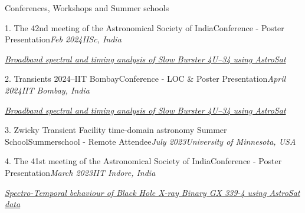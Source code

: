 \begin{section}{Conferences, Workshops and Summer schools}

    \begin{subsectionnobullet1}{1. The 42nd meeting of the Astronomical Society of India}{Conference - Poster Presentation}{\textit{Feb 2024}}{\textit{IISc, India}}
    \vspace{-1em}
    \item\textit{\href{https://www.dropbox.com/scl/fi/aw33s2tmk6wsrwwbju25e/ASI-2024-poster.pdf?rlkey=aiasm86d2e3t40235q0knu635&st=3qr65pz8&dl=0}{Broadband spectral and timing analysis of Slow Burster 4U--34 using AstroSat}}
    \end{subsectionnobullet1}

    \vspace{-0.5em}

    \begin{subsectionnobullet1}{2. Transients 2024--IIT Bombay}{Conference - LOC \& Poster Presentation}{\textit{April 2024}}{\textit{IIT Bombay, India}}
    \vspace{-1em}
    \item\textit{\href{https://www.dropbox.com/scl/fi/aw33s2tmk6wsrwwbju25e/ASI-2024-poster.pdf?rlkey=aiasm86d2e3t40235q0knu635&st=3qr65pz8&dl=0}{Broadband spectral and timing analysis of Slow Burster 4U--34 using AstroSat}}
    \end{subsectionnobullet1}

     \vspace{-0.5em}

    \begin{subsectionnobullet1}{3. Zwicky Transient Facility time-domain astronomy Summer School}{Summerschool - Remote Attendee}{\textit{July 2023}}{\textit{University of Minnesota, USA}}
    \end{subsectionnobullet1}

     \vspace{-0.5em}

    \begin{subsectionnobullet1}{4. The 41st meeting of the Astronomical Society of India}{Conference - Poster Presentation}{\textit{March 2023}}{\textit{IIT Indore, India}}
    \vspace{-1em}
    \item\textit{\href{https://www.dropbox.com/scl/fi/2vxerkx3lhnbb6bgwactw/ASI-2023-Poster.pdf?rlkey=1hyjudte4bn1xf4sks47nb0c5&st=lc2jnnm0&dl=0}{Spectro-Temporal behaviour of Black Hole X-ray Binary GX 339-4 using AstroSat data}}
    \end{subsectionnobullet1}


\end{section}
